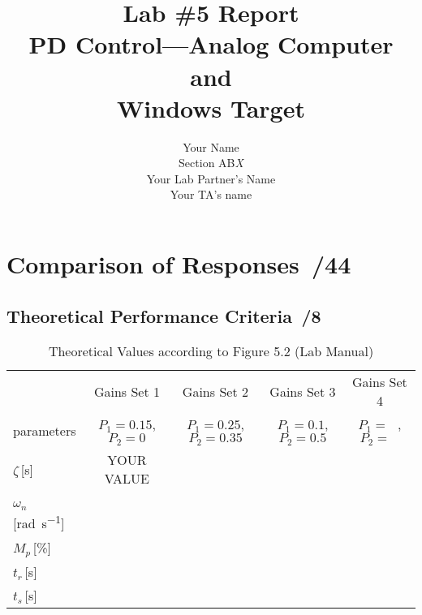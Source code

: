 \documentclass{article}
\newcommand{\score}{\hfill \underline{\hspace{0.65cm}}\,/} %
\begin{document}
\title{\bf Lab \#5 Report\\{\sc PD Control---Analog Computer and \\ Windows Target}}
\author{Your Name\\ Section AB\emph{X}\\
Your Lab Partner's Name\\
Your TA's name}
\maketitle

\noindent {}

\section{Comparison of Responses  \score 44}
\subsection{Theoretical Performance Criteria \score 8}
\begin{table}[phtb]\footnotesize \label{tbl:lab5_q1_1}
\begin{center}
\caption{Theoretical Values according to Figure 5.2 (Lab Manual)}
\begin{tabular}{l|m{1.2cm}|m{1.2cm}|m{1.2cm}|m{1.2cm}|m{1.2cm}|m{1.2cm}|m{1.2cm}|m{1.2cm}} \hline \hline
\cellcolor{lightgray} & \multicolumn{2}{c|}{\cellcolor{lightgray}Gains Set 1} & \multicolumn{2}{c|}{\cellcolor{lightgray}Gains Set 2} & \multicolumn{2}{c|}{\cellcolor{lightgray}Gains Set 3} & \multicolumn{2}{c}{\cellcolor{lightgray}Gains Set 4}\\ \cline{2-9}
\multirow{-2}{*}{\cellcolor{lightgray}parameters}& \multicolumn{2}{c|}{$P_1 = 0.15$, $P_2 = 0$}& \multicolumn{2}{c|}{$P_1 = 0.25$, $P_2 = 0.35$}& \multicolumn{2}{c|}{$P_1 = 0.1$, $P_2 = 0.5$}& \multicolumn{2}{c}{$P_1 = ~~~$, $P_2 = ~~~$}\\ \hline
$\zeta$\,[\si{\second}] & \multicolumn{2}{c|}{YOUR VALUE} & \multicolumn{2}{c|}{} & \multicolumn{2}{c|}{} & \multicolumn{2}{c}{} \\ \hline
$\omega_n$\,[\si{\radian\per\second}] & \multicolumn{2}{c|}{} & \multicolumn{2}{c|}{} & \multicolumn{2}{c|}{} & \multicolumn{2}{c}{} \\ \hline
$M_p$\,[\%]& \multicolumn{2}{c|}{} & \multicolumn{2}{c|}{~} & \multicolumn{2}{c|}{~} & \multicolumn{2}{c}{~} \\ \hline
$t_r$\,[\si{\second}] & \multicolumn{2}{c|}{} & \multicolumn{2}{c|}{} & \multicolumn{2}{c|}{} & \multicolumn{2}{c}{} \\ \hline
$t_s$\,[\si{\second}] & \multicolumn{2}{c|}{} & \multicolumn{2}{c|}{} & \multicolumn{2}{c|}{} & \multicolumn{2}{c}{} \\ \hline
\end{tabular}
\end{center}
\end{table}
\end{document}
